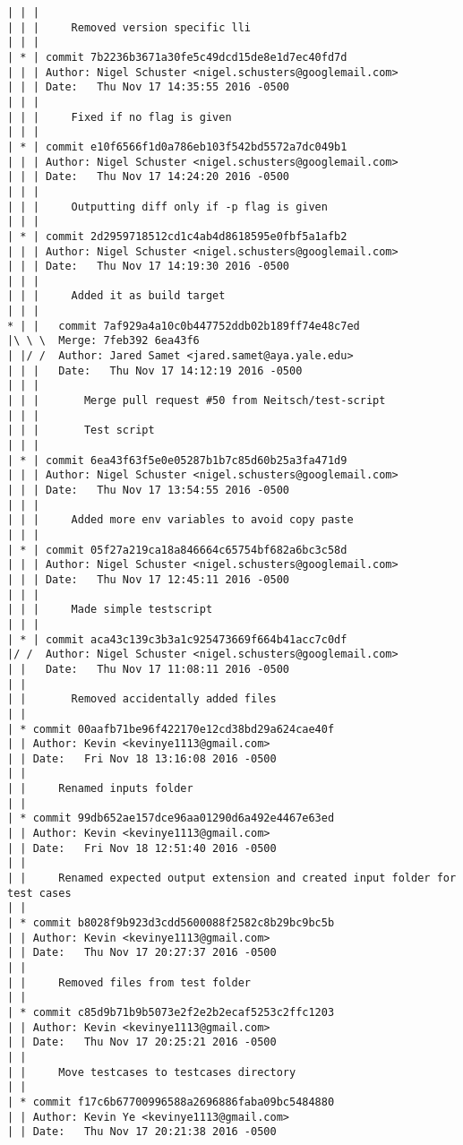 \begin{lstlisting}
| | | 
| | |     Removed version specific lli
| | |    
| * | commit 7b2236b3671a30fe5c49dcd15de8e1d7ec40fd7d
| | | Author: Nigel Schuster <nigel.schusters@googlemail.com>
| | | Date:   Thu Nov 17 14:35:55 2016 -0500
| | | 
| | |     Fixed if no flag is given
| | |    
| * | commit e10f6566f1d0a786eb103f542bd5572a7dc049b1
| | | Author: Nigel Schuster <nigel.schusters@googlemail.com>
| | | Date:   Thu Nov 17 14:24:20 2016 -0500
| | | 
| | |     Outputting diff only if -p flag is given
| | |    
| * | commit 2d2959718512cd1c4ab4d8618595e0fbf5a1afb2
| | | Author: Nigel Schuster <nigel.schusters@googlemail.com>
| | | Date:   Thu Nov 17 14:19:30 2016 -0500
| | | 
| | |     Added it as build target
| | |      
* | |   commit 7af929a4a10c0b447752ddb02b189ff74e48c7ed
|\ \ \  Merge: 7feb392 6ea43f6
| |/ /  Author: Jared Samet <jared.samet@aya.yale.edu>
| | |   Date:   Thu Nov 17 14:12:19 2016 -0500
| | |   
| | |       Merge pull request #50 from Neitsch/test-script
| | |       
| | |       Test script
| | |    
| * | commit 6ea43f63f5e0e05287b1b7c85d60b25a3fa471d9
| | | Author: Nigel Schuster <nigel.schusters@googlemail.com>
| | | Date:   Thu Nov 17 13:54:55 2016 -0500
| | | 
| | |     Added more env variables to avoid copy paste
| | |    
| * | commit 05f27a219ca18a846664c65754bf682a6bc3c58d
| | | Author: Nigel Schuster <nigel.schusters@googlemail.com>
| | | Date:   Thu Nov 17 12:45:11 2016 -0500
| | | 
| | |     Made simple testscript
| | |    
| * | commit aca43c139c3b3a1c925473669f664b41acc7c0df
|/ /  Author: Nigel Schuster <nigel.schusters@googlemail.com>
| |   Date:   Thu Nov 17 11:08:11 2016 -0500
| |   
| |       Removed accidentally added files
| |   
| * commit 00aafb71be96f422170e12cd38bd29a624cae40f
| | Author: Kevin <kevinye1113@gmail.com>
| | Date:   Fri Nov 18 13:16:08 2016 -0500
| | 
| |     Renamed inputs folder
| |   
| * commit 99db652ae157dce96aa01290d6a492e4467e63ed
| | Author: Kevin <kevinye1113@gmail.com>
| | Date:   Fri Nov 18 12:51:40 2016 -0500
| | 
| |     Renamed expected output extension and created input folder for test cases
| |   
| * commit b8028f9b923d3cdd5600088f2582c8b29bc9bc5b
| | Author: Kevin <kevinye1113@gmail.com>
| | Date:   Thu Nov 17 20:27:37 2016 -0500
| | 
| |     Removed files from test folder
| |   
| * commit c85d9b71b9b5073e2f2e2b2ecaf5253c2ffc1203
| | Author: Kevin <kevinye1113@gmail.com>
| | Date:   Thu Nov 17 20:25:21 2016 -0500
| | 
| |     Move testcases to testcases directory
| |   
| * commit f17c6b67700996588a2696886faba09bc5484880
| | Author: Kevin Ye <kevinye1113@gmail.com>
| | Date:   Thu Nov 17 20:21:38 2016 -0500

\end{lstlisting}
